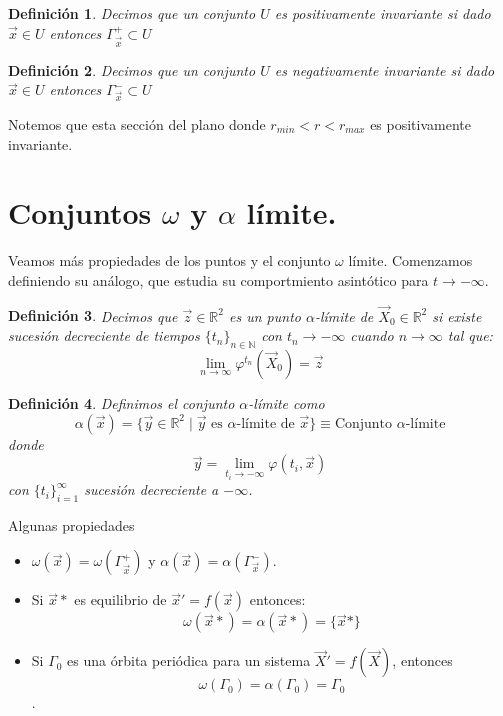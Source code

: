 \documentclass[12pt, a4paper]{report}
\newtheorem{definition}{Definición}
\begin{document}
\begin{definition}
	Decimos que un conjunto $U$ es positivamente invariante si dado $\vec{x}\in U$ entonces  $\varGamma_{\vec{x}}^{+}\subset U$
\end{definition}

\begin{definition}
	Decimos que un conjunto $U$ es negativamente invariante si dado $\vec{x}\in U$ entonces  $\varGamma_{\vec{x}}^{-}\subset U$
\end{definition}

Notemos que esta sección del plano donde $r_{min}<r<r_{max}$ es positivamente invariante.
\newpage

\section{Conjuntos $\omega$ y $\alpha$ límite.}

Veamos más propiedades de los puntos y el conjunto $\omega$ límite. Comenzamos definiendo su análogo,
que estudia su comportmiento asintótico para $t\to-\infty$.\\

\begin{definition}
	Decimos que $\vec{z}\in\mathbb{R}^2$ es un punto $\alpha$-límite
	de $\vec{X}_0\in\mathbb{R}^2$ si existe sucesión decreciente de
	tiempos $\{t_n\}_{n\in\mathbb{N}}$
	con $t_n \to-\infty$ cuando $n\to \infty$ tal que:
	$$\lim_{n\to\infty}\varphi^{t_n}(\vec{X}_0)=\vec{z}$$
\end{definition}


\begin{definition}
	Definimos el conjunto $\alpha$-límite como $$\alpha(\vec{x})=\{\vec{y}\in\mathbb{R}^2\mid\vec{y}
		\text{ es } \alpha\text{-límite de }\vec{x}\}\equiv\text{Conjunto }\alpha\text{-límite}$$
	donde
	$$\vec{y}=\lim_{t_i\to-\infty}\varphi(t_i,\vec{x})$$
	con $\{t_i\}_{i=1}^{\infty}$ sucesión decreciente a $-\infty$.
\end{definition}

Algunas propiedades
\begin{itemize}
	\item $\omega(\vec{x})=\omega(\varGamma_{\vec{x}}^{+})$
	      y $\alpha(\vec{x})=\alpha(\varGamma_{\vec{x}}^{-})$.\\
	\item Si $\vec{x}*$ es equilibrio de $\vec{x}'=f(\vec{x})$ entonces:
	      $$\omega(\vec{x}*)=\alpha(\vec{x}*)=\{\vec{x}*\}$$
	\item Si $\varGamma_0$ es una órbita periódica para un sistema $\vec{X}'=f(\vec{X})$, entonces
	      $$\omega(\varGamma_0)=\alpha(\varGamma_0)=\varGamma_0$$.
\end{itemize}
\end{document}

